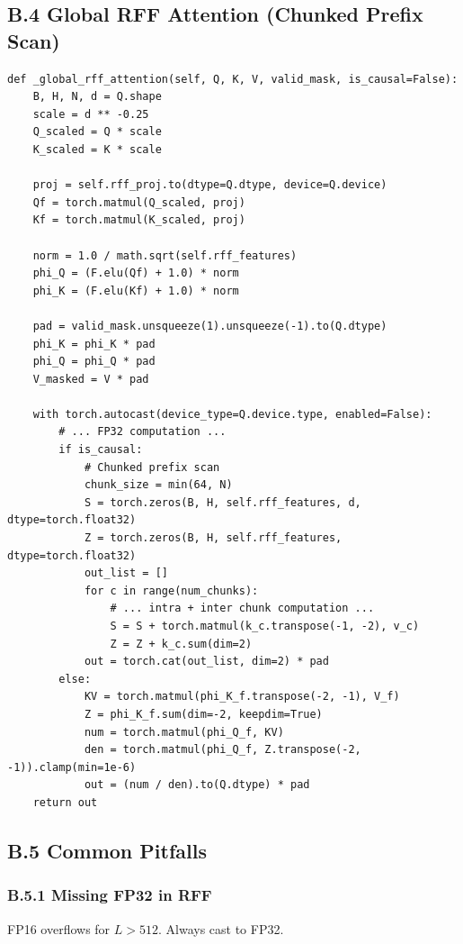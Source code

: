\subsection{B.4 Global RFF Attention (Chunked Prefix Scan)}

\begin{lstlisting}
def _global_rff_attention(self, Q, K, V, valid_mask, is_causal=False):
    B, H, N, d = Q.shape
    scale = d ** -0.25
    Q_scaled = Q * scale
    K_scaled = K * scale
    
    proj = self.rff_proj.to(dtype=Q.dtype, device=Q.device)
    Qf = torch.matmul(Q_scaled, proj)
    Kf = torch.matmul(K_scaled, proj)
    
    norm = 1.0 / math.sqrt(self.rff_features)
    phi_Q = (F.elu(Qf) + 1.0) * norm
    phi_K = (F.elu(Kf) + 1.0) * norm
    
    pad = valid_mask.unsqueeze(1).unsqueeze(-1).to(Q.dtype)
    phi_K = phi_K * pad
    phi_Q = phi_Q * pad
    V_masked = V * pad
    
    with torch.autocast(device_type=Q.device.type, enabled=False):
        # ... FP32 computation ...
        if is_causal:
            # Chunked prefix scan
            chunk_size = min(64, N)
            S = torch.zeros(B, H, self.rff_features, d, dtype=torch.float32)
            Z = torch.zeros(B, H, self.rff_features, dtype=torch.float32)
            out_list = []
            for c in range(num_chunks):
                # ... intra + inter chunk computation ...
                S = S + torch.matmul(k_c.transpose(-1, -2), v_c)
                Z = Z + k_c.sum(dim=2)
            out = torch.cat(out_list, dim=2) * pad
        else:
            KV = torch.matmul(phi_K_f.transpose(-2, -1), V_f)
            Z = phi_K_f.sum(dim=-2, keepdim=True)
            num = torch.matmul(phi_Q_f, KV)
            den = torch.matmul(phi_Q_f, Z.transpose(-2, -1)).clamp(min=1e-6)
            out = (num / den).to(Q.dtype) * pad
    return out
\end{lstlisting}

\subsection{B.5 Common Pitfalls}

\subsubsection{B.5.1 Missing FP32 in RFF}

FP16 overflows for $L > 512$. Always cast to FP32.

